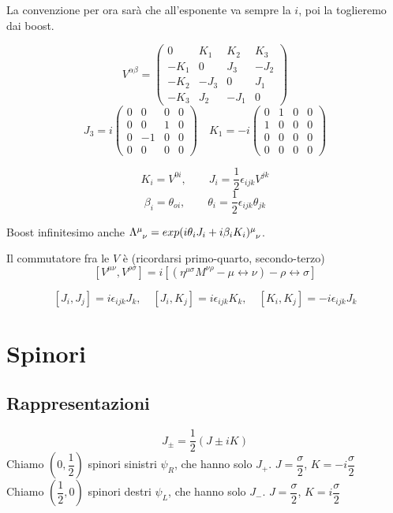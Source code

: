\documentclass[12pt,a4paper]{article}
\begin{document}
	La convenzione per ora sarà che all'esponente va sempre la $i$, poi la toglieremo dai boost.
	
	\[ V^{\alpha\beta} = \begin{pmatrix}
	0 & K_1 & K_2 & K_3 \\
	-K_1 & 0 & J_3 & -J_2 \\
	-K_2 & -J_3 & 0 & J_1 \\
	-K_3 & J_2 & -J_1 & 0 
	\end{pmatrix} \]
	\[ J_3 = i\begin{pmatrix}
	0 & 0 & 0 & 0 \\
	0 & 0 & 1 & 0 \\
	0 & -1 & 0 & 0 \\
	0 & 0 & 0 & 0 
	\end{pmatrix}
	\quad
	K_1 = -i\begin{pmatrix}
	0 & 1 & 0 & 0 \\
	1 & 0 & 0 & 0 \\
	0 & 0 & 0 & 0 \\
	0 & 0 & 0 & 0 
	\end{pmatrix}
	\]
	
	\[ K_i = V^{0i},\qquad J_i = \dfrac{1}{2} \epsilon_{ijk} V^{jk} \]
	\[ \beta_i = \theta_{oi},\qquad \theta_i = \dfrac{1}{2} \epsilon_{ijk} \theta_{jk} \]
	
	Boost infinitesimo anche $\Lambda\indices{^\mu_\nu} = exp(i \theta_i J_i + i\beta_i K_i)\indices{^\mu_\nu}$.
	
	Il commutatore fra le $V$ è (ricordarsi primo-quarto, secondo-terzo)
	\[ [V^{\mu\nu}, V^{\rho\sigma}] = i [(\eta^{\mu\sigma} M^{\nu\rho} - \mu\leftrightarrow\nu) - \rho\leftrightarrow\sigma ] \]
	
	\[ [J_i, J_j] = i \epsilon_{ijk} J_k,\quad [J_i, K_j] = i \epsilon_{ijk} K_k,\quad [K_i, K_j] = -i\epsilon_{ijk} J_k \]
	
	\section{Spinori}
	\subsection{Rappresentazioni}
	\[ J_\pm = \dfrac{1}{2} (J\pm i K) \]
	Chiamo $\left(0, \dfrac{1}{2}\right)$ spinori sinistri $\psi_R$, che hanno solo $J_+$. $J=\dfrac{\sigma}{2}$, $K = -i\dfrac{\sigma}{2}$\\
	Chiamo $\left(\dfrac{1}{2}, 0\right)$ spinori destri $\psi_L$, che hanno solo $J_-$. $J=\dfrac{\sigma}{2}$, $K = i\dfrac{\sigma}{2}$
	
\end{document}
